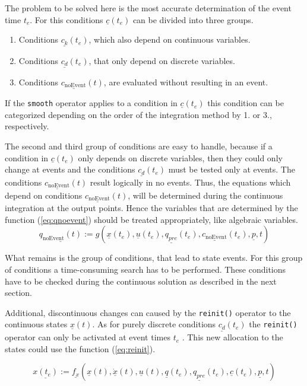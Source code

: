 The problem to be solved here is the most accurate determination of the event
time $t_e$. For this conditions $\underline{c}(t_e)$ can be divided into three
groups.
\begin{enumerate}
  \item Conditions $\underline{c_k}(t_e)$, which also depend on continuous
  variables.
  \item Conditions $\underline{c_d}(t_e)$, that only depend on discrete
  variables.
  \item Conditions $\underline{c_{\text{noEvent}}}(t)$, are evaluated without
  resulting in an event.
\end{enumerate}

If the \verb+smooth+ operator applies to a condition in $\underline{c}(t_e)$
this condition can be categorized depending on the order of the integration
method by 1. or 3., respectively.

The second and third group of conditions are easy to handle, because if a
condition in $\underline{c}(t_e)$ only depends on discrete variables, then they
could only change at events and the conditions $\underline{c_d}(t_e)$ must be
tested only at events. The conditions $\underline{c_{\text{noEvent}}}(t)$
result logically in no events. Thus, the equations which depend on conditions
$\underline{c_{\text{noEvent}}}(t)$, will be determined during the continuous
integration at the output points. Hence the variables that are determined by
the function (\ref{eq:qnoevent}) should be treated appropriately, like
algebraic variables.
\begin{equation}\label{eq:qnoevent}
\underline{q_{\text{noEvent}}(t)} :=
g(\underline{x}(t_e), \underline{u}(t_e), \underline{q_{pre}}(t_e),
\underline{c_{\text{noEvent}}}(t_e), \underline{p} ,t)
\end{equation}

What remains is the group of conditions, that lead to state events. For this
group of conditions a time-consuming search has to be performed.  These
conditions have to be checked during the continuous solution as described in the
next section.

Additional, discontinuous changes can caused by the \verb+reinit()+ operator to
the continuous states $\underline{x}(t)$.
As for purely discrete conditions $\underline{c_d}(t_e)$ the \verb+reinit()+
operator can only be activated at event times $t_e$ . This new allocation to
the states could use the function (\ref{eq:reinit}).

\begin{equation}\label{eq:reinit}
\underline{x(t_e)} := \underline{f_x}(\underline{x}(t),\underline{\dot
x}(t), \underline{u}(t), \underline{q}(t_e), \underline{q_{pre}}(t_e),
\underline{c}(t_e), \underline{p} ,t)
\end{equation}


